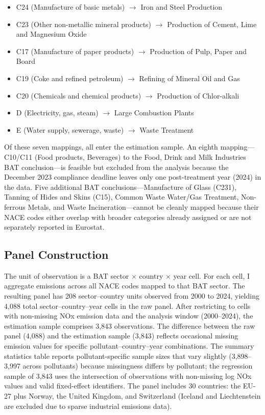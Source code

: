 \documentclass[12pt]{article}
\begin{document}
\begin{itemize}
  \item C24 (Manufacture of basic metals) $\rightarrow$ Iron and Steel Production
  \item C23 (Other non-metallic mineral products) $\rightarrow$ Production of Cement, Lime and Magnesium Oxide
  \item C17 (Manufacture of paper products) $\rightarrow$ Production of Pulp, Paper and Board
  \item C19 (Coke and refined petroleum) $\rightarrow$ Refining of Mineral Oil and Gas
  \item C20 (Chemicals and chemical products) $\rightarrow$ Production of Chlor-alkali
  \item D (Electricity, gas, steam) $\rightarrow$ Large Combustion Plants
  \item E (Water supply, sewerage, waste) $\rightarrow$ Waste Treatment
\end{itemize}

Of these seven mappings, all enter the estimation sample. An eighth mapping---C10/C11 (Food products, Beverages) to the Food, Drink and Milk Industries BAT conclusion---is feasible but excluded from the analysis because the December 2023 compliance deadline leaves only one post-treatment year (2024) in the data. Five additional BAT conclusions---Manufacture of Glass (C231), Tanning of Hides and Skins (C15), Common Waste Water/Gas Treatment, Non-ferrous Metals, and Waste Incineration---cannot be cleanly mapped because their NACE codes either overlap with broader categories already assigned or are not separately reported in Eurostat.

\subsection{Panel Construction}

The unit of observation is a BAT sector $\times$ country $\times$ year cell. For each cell, I aggregate emissions across all NACE codes mapped to that BAT sector. The resulting panel has 208 sector--country units observed from 2000 to 2024, yielding 4,088 total sector--country--year cells in the raw panel. After restricting to cells with non-missing NOx emission data and the analysis window (2000--2024), the estimation sample comprises 3,843 observations. The difference between the raw panel (4,088) and the estimation sample (3,843) reflects occasional missing emission values for specific pollutant--country--year combinations. The summary statistics table reports pollutant-specific sample sizes that vary slightly (3,898--3,997 across pollutants) because missingness differs by pollutant; the regression sample of 3,843 uses the intersection of observations with non-missing log NOx values and valid fixed-effect identifiers. The panel includes 30 countries: the EU-27 plus Norway, the United Kingdom, and Switzerland (Iceland and Liechtenstein are excluded due to sparse industrial emissions data).
\end{document}
